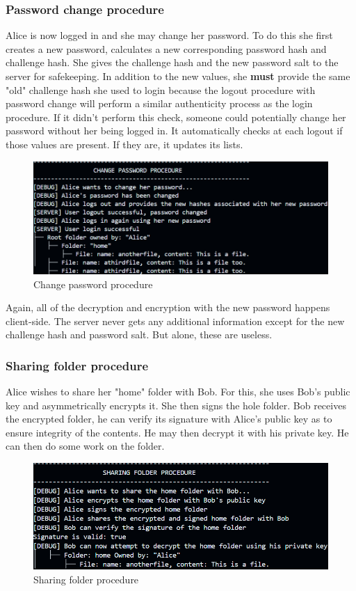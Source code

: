 \subsubsection{Password change procedure}
Alice is now logged in and she may change her password. To do this she first creates a new password, calculates a new corresponding password hash and challenge hash. She gives the challenge hash and the new password salt to the server for safekeeping. In addition to the new values, she \textbf{must} provide the same "old" challenge hash she used to login because the logout procedure with password change will perform a similar authenticity process as the login procedure. If it didn't perform this check, someone could potentially change her password without her being logged in. It automatically checks at each logout if those values are present. If they are, it updates its lists.

\begin{figure}[H]
    \centering
    \includegraphics[width=\textwidth]{screenshots/password_procedure.png}
    \caption{Change password procedure}
    \label{fig:password_procedure}
\end{figure}

Again, all of the decryption and encryption with the new password happens client-side. The server never gets any additional information except for the new challenge hash and password salt. But alone, these are useless.

\subsubsection{Sharing folder procedure}
Alice wishes to share her "home" folder with Bob. For this, she uses Bob's public key and asymmetrically encrypts it. She then signs the hole folder. Bob receives the encrypted folder, he can verify its signature with Alice's public key as to ensure integrity of the contents. He may then decrypt it with his private key. He can then do some work on the folder.

\begin{figure}[H]
    \centering
    \includegraphics[width=\textwidth]{screenshots/share_procedure.png}
    \caption{Sharing folder procedure}
    \label{fig:share_procedure}
\end{figure}




